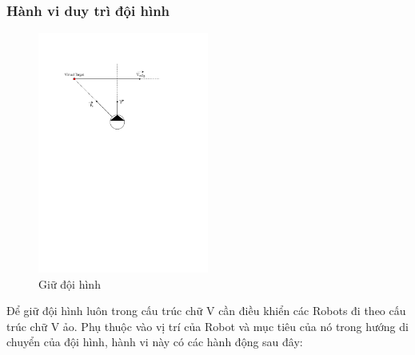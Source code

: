 \subsubsection{Hành vi duy trì đội hình}
\begin{figure}[h]
    \centering
    \includegraphics[width = 0.5\textwidth]{chapter3/image/V_Form_Crop.pdf}
    \caption{Giữ đội hình}
    \label{fig:keep}
\end{figure}
Để giữ đội hình luôn trong cấu trúc chữ V cần điều khiển các Robots đi theo cấu trúc chữ V ảo. Phụ thuộc vào vị trí của Robot và mục tiêu của nó trong hướng di chuyển của đội hình, hành vi này có các hành động sau đây:
